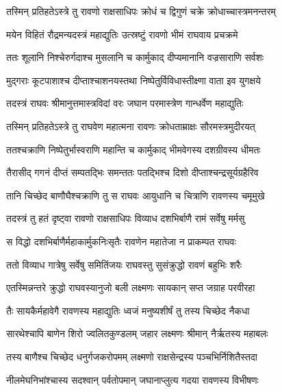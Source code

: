 
\twolineshloka
{तस्मिन् प्रतिहतेऽस्त्रे तु रावणो राक्षसाधिपः}
{क्रोधं च द्विगुणं चक्रे क्रोधाच्चास्त्रमनन्तरम्} %

\twolineshloka
{मयेन विहितं रौद्रमन्यदस्त्रं महाद्युतिः}
{उत्स्रष्टुं रावणो भीमं राघवाय प्रचक्रमे} %

\twolineshloka
{ततः शूलानि निश्चेरुर्गदाश्च मुसलानि च}
{कार्मुकाद् दीप्यमानानि वज्रसाराणि सर्वशः} %

\twolineshloka
{मुद्गराः कूटपाशाश्च दीप्ताश्चाशनयस्तथा}
{निष्पेतुर्विविधास्तीक्ष्णा वाता इव युगक्षये} %

\twolineshloka
{तदस्त्रं राघवः श्रीमानुत्तमास्त्रविदां वरः}
{जघान परमास्त्रेण गान्धर्वेण महाद्युतिः} %

\twolineshloka
{तस्मिन् प्रतिहतेऽस्त्रे तु राघवेण महात्मना}
{रावणः क्रोधताम्राक्षः सौरमस्त्रमुदीरयत्} %

\twolineshloka
{ततश्चक्राणि निष्पेतुर्भास्वराणि महान्ति च}
{कार्मुकाद् भीमवेगस्य दशग्रीवस्य धीमतः} %

\twolineshloka
{तैरासीद् गगनं दीप्तं सम्पतद्भिः समन्ततः}
{पतद्भिश्च दिशो दीप्ताश्चन्द्रसूर्यग्रहैरिव} %

\twolineshloka
{तानि चिच्छेद बाणौघैश्चक्राणि तु स राघवः}
{आयुधानि च चित्राणि रावणस्य चमूमुखे} %

\twolineshloka
{तदस्त्रं तु हतं दृष्ट्वा रावणो राक्षसाधिपः}
{विव्याध दशभिर्बाणै रामं सर्वेषु मर्मसु} %

\twolineshloka
{स विद्धो दशभिर्बाणैर्महाकार्मुकनिःसृतैः}
{रावणेन महातेजा न प्राकम्पत राघवः} %

\twolineshloka
{ततो विव्याध गात्रेषु सर्वेषु समितिंजयः}
{राघवस्तु सुसंक्रुद्धो रावणं बहुभिः शरैः} %

\twolineshloka
{एतस्मिन्नन्तरे क्रुद्धो राघवस्यानुजो बली}
{लक्ष्मणः सायकान् सप्त जग्राह परवीरहा} %

\twolineshloka
{तैः सायकैर्महावेगै रावणस्य महाद्युतिः}
{ध्वजं मनुष्यशीर्षं तु तस्य चिच्छेद नैकधा} %

\twolineshloka
{सारथेश्चापि बाणेन शिरो ज्वलितकुण्डलम्}
{जहार लक्ष्मणः श्रीमान् नैर्ऋतस्य महाबलः} %

\twolineshloka
{तस्य बाणैश्च चिच्छेद धनुर्गजकरोपमम्}
{लक्ष्मणो राक्षसेन्द्रस्य पञ्चभिर्निशितैस्तदा} %

\twolineshloka
{नीलमेघनिभांश्चास्य सदश्वान् पर्वतोपमान्}
{जघानाप्लुत्य गदया रावणस्य विभीषणः} %

